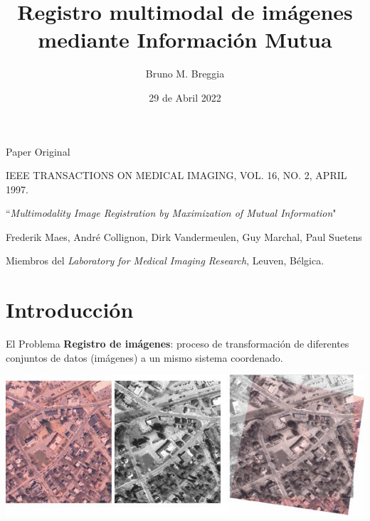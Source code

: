 \documentclass[14pt,xcolor={rgb}]{beamer}
\begin{document}
\title{Registro multimodal de im\'agenes mediante Informaci\'on Mutua}
\author{Bruno M. Breggia}
\date{29 de Abril 2022}

\begin{frame}[plain]
\titlepage
\end{frame}

\begin{frame}{Paper Original}

{\tiny IEEE TRANSACTIONS ON MEDICAL IMAGING, VOL. 16, NO. 2, APRIL 1997.}

	\begin{center}
	``\textit{Multimodality Image Registration by Maximization of Mutual Information}"
	
	{\small Frederik Maes, Andr\'e Collignon, Dirk Vandermeulen, Guy Marchal, Paul Suetens}
	\end{center}

{\small Miembros del \textit{Laboratory for Medical Imaging Research}, Leuven, B\'elgica.}
\end{frame}

\section{Introducci\'on}

\begin{frame}{El Problema}
\textbf{Registro de im\'agenes}: proceso de transformaci\'on de diferentes conjuntos de datos (im\'agenes) a un mismo sistema coordenado.
\begin{center}
	\includegraphics[scale=0.5]{Images/registration.jpg}
\end{center}
\end{frame}
\end{document}
